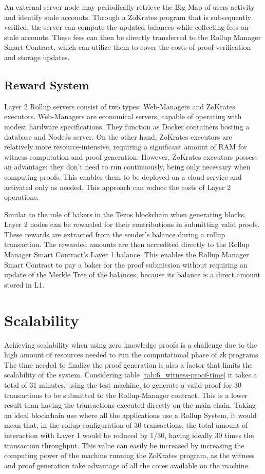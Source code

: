 An external server node may periodically retrieve the Big Map of users activity and identify stale accounts. Through a ZoKrates program that is subsequently verified, the server can compute the updated balances while collecting fees on stale accounts. These fees can then be directly transferred to the Rollup Manager Smart Contract, which can utilize them to cover the costs of proof verification and storage updates.

\subsection{Reward System}

Layer 2 Rollup servers consist of two types: Web-Managers and ZoKrates executors. Web-Managers are economical servers, capable of operating with modest hardware specifications. They function as Docker containers hosting a database and NodeJs server. On the other hand, ZoKrates executors are relatively more resource-intensive, requiring a significant amount of RAM for witness computation and proof generation. However, ZoKrates executors possess an advantage: they don't need to run continuously, being only necessary when computing proofs. This enables them to be deployed on a cloud service and activated only as needed. This approach can reduce the costs of Layer 2 operations.

Similar to the role of bakers in the Tezos blockchain when generating blocks, Layer 2 nodes can be rewarded for their contributions in submitting valid proofs. These rewards are extracted from the sender's balance during a rollup transaction. The rewarded amounts are then accredited directly to the Rollup Manager Smart Contract's Layer 1 balance. This enables the Rollup Manager Smart Contract to pay a baker for the proof submission without requiring an update of the Merkle Tree of the balances, because its balance is a direct amount stored in L1.

\section{Scalability}

Achieving scalability when using zero knowledge proofs is a challenge due to the high amount of resources needed to run the computational phase of zk programs. The time needed to finalize the proof generation is also a factor that limits the scalability of the system. Considering table \ref{tab:6_witness-proof-time} it takes a total of 31 minutes, using the test machine, to generate a valid proof for 30 transactions to be submitted to the Rollup-Manager contract. This is a lower result than having the transactions executed directly on the main chain. Taking an ideal blockchain use where all the applications use a Rollup System, it would mean that, in the rollup configuration of 30 transactions, the total amount of interaction with Layer 1 would be reduced by $1/30$, having ideally 30 times the transaction throughput. This value can easily be increased by increasing the computing power of the machine running the ZoKrates program, as the witness and proof generation take advantage of all the cores available on the machine.

